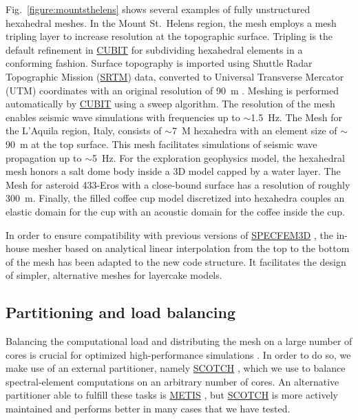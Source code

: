 \documentclass[referee,extra]{gji}
\begin{document}
Fig.~\ref{figure:mountsthelens} shows several examples of fully unstructured hexahedral meshes.
In the Mount St.~Helens region, the mesh employs a mesh tripling layer to increase resolution at the topographic surface.
Tripling is the default refinement in \href{http://cubit.sandia.gov}{CUBIT} for subdividing hexahedral elements in a conforming fashion.
Surface topography is imported using Shuttle Radar Topographic Mission (\href{http://srtm.csi.cgiar.org/}{SRTM})
data, converted to Universal Transverse Mercator (UTM) coordinates with an original resolution of 90~m \citep{JaReNeGue2008}.
Meshing is performed automatically by \href{http://cubit.sandia.gov}{CUBIT} using a sweep algorithm.
The resolution of the mesh enables seismic wave simulations with frequencies up to $\sim$1.5~Hz.
The Mesh for the L'Aquila region, Italy, consists of $\sim$7~M hexahedra with an element size of $\sim$90~m at the top surface.
This mesh facilitates simulations of seismic wave propagation up to $\sim$5~Hz.
For the exploration geophysics model,
the hexahedral mesh honors a salt dome body inside a 3D model capped by a water layer.
The Mesh for asteroid 433-Eros with a close-bound surface has a resolution of roughly 300~m.
Finally, the filled coffee cup model discretized into hexahedra
couples an elastic domain for the cup with an acoustic domain for the coffee inside the cup.

In order to ensure compatibility with previous versions of \href{http://www.geodynamics.org/cig/software/specfem3d}{SPECFEM3D}
\citep[see e.g.,][]{KoLiTrSuStSh04,LiPoKoTr04},
the in-house mesher based on analytical linear interpolation from the top to the bottom of the mesh has been
adapted to the new code structure.
It facilitates the design of simpler, alternative meshes for layercake models.

\subsection{Partitioning and load balancing}\label{subsec:partitioning}

Balancing the computational load and distributing the mesh on a large number of cores is crucial for
optimized high-performance simulations \citep{MaKoBlLe08}.
In order to do so, we make use of an external partitioner, namely
\href{http://www.labri.fr/perso/pelegrin/scotch/}{SCOTCH} \citep{PeRo96,ChPe08}, which we use to
balance spectral-element computations on an arbitrary number of cores.
An alternative partitioner able to fulfill these tasks is
\href{http://glaros.dtc.umn.edu/gkhome/views/metis}{METIS} \citep{KaKu98c}, but \href{http://www.labri.fr/perso/pelegrin/scotch/}{SCOTCH} is more actively maintained
\citep{ChPe08} and performs better in many cases that we have tested.
\end{document}
